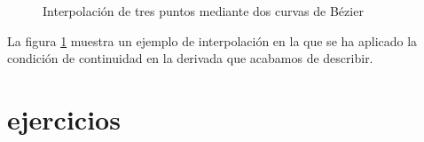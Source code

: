 \begin{figure}[h]
\centering
{} \qquad 
{}
\caption{Interpolación de tres puntos mediante dos curvas de Bézier} 
\label{fig:ibz3}
\end{figure}
 
\begin{paracol}{2}
La figura \ref{fig:ibz3} muestra un ejemplo de interpolación en la que se ha aplicado la condición de continuidad en la derivada que acabamos de describir.
\end{paracol}
\section{ejercicios}
